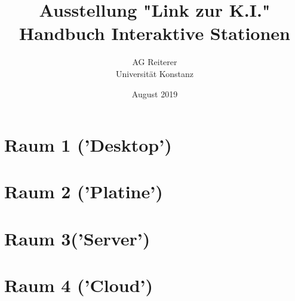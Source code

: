 \documentclass[titlepage,a4paper]{article}
\title{Ausstellung "Link zur K.I."\\
Handbuch Interaktive Stationen}
\author{
    AG Reiterer\\
    Universität Konstanz
}
\date{August 2019}
\begin{document}
\begin{titlepage}
\maketitle
\end{titlepage}



\tableofcontents

\pagebreak

\listoffigures 

\pagebreak


\section{Raum 1 ('Desktop')}

\section{Raum 2 ('Platine')}

\section{Raum 3('Server')}

\section{Raum 4 ('Cloud')}
\end{document}
